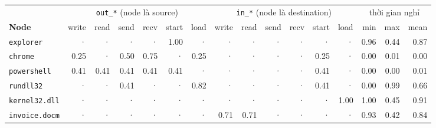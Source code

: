 \begin{table}[H]
\centering
\scriptsize
\setlength{\tabcolsep}{2.6pt}
\begin{tabular}{l *{6}{r} *{6}{r} *{3}{r}}
\toprule
& \multicolumn{6}{c}{\texttt{out\_*} (node là source)} & \multicolumn{6}{c}{\texttt{in\_*} (node là destination)} & \multicolumn{3}{c}{thời gian nghỉ} \\
\cmidrule(lr){2-7}\cmidrule(lr){8-13}\cmidrule(lr){14-16}
\textbf{Node} & write & read & send & recv & start & load & write & read & send & recv & start & load & min & max & mean \\
\midrule
\texttt{explorer} & \textcolor{gray!50}{·} & \textcolor{gray!50}{·} & \textcolor{gray!50}{·} & \textcolor{gray!50}{·} & 1.00 & \textcolor{gray!50}{·} & \textcolor{gray!50}{·} & \textcolor{gray!50}{·} & \textcolor{gray!50}{·} & \textcolor{gray!50}{·} & \textcolor{gray!50}{·} & \textcolor{gray!50}{·} & 0.96 & 0.44 & 0.87 \\
\texttt{chrome} & 0.25 & \textcolor{gray!50}{·} & 0.50 & 0.75 & \textcolor{gray!50}{·} & 0.25 & \textcolor{gray!50}{·} & \textcolor{gray!50}{·} & \textcolor{gray!50}{·} & \textcolor{gray!50}{·} & 0.25 & \textcolor{gray!50}{·} & 0.00 & 0.01 & 0.00 \\
\texttt{powershell} & 0.41 & 0.41 & 0.41 & 0.41 & 0.41 & \textcolor{gray!50}{·} & \textcolor{gray!50}{·} & \textcolor{gray!50}{·} & \textcolor{gray!50}{·} & \textcolor{gray!50}{·} & 0.41 & \textcolor{gray!50}{·} & 0.00 & 0.00 & 0.01 \\
\texttt{rundll32} & \textcolor{gray!50}{·} & \textcolor{gray!50}{·} & 0.41 & \textcolor{gray!50}{·} & \textcolor{gray!50}{·} & 0.82 & \textcolor{gray!50}{·} & \textcolor{gray!50}{·} & \textcolor{gray!50}{·} & \textcolor{gray!50}{·} & 0.41 & \textcolor{gray!50}{·} & 0.00 & 0.99 & 0.66 \\
\texttt{kernel32.dll} & \textcolor{gray!50}{·} & \textcolor{gray!50}{·} & \textcolor{gray!50}{·} & \textcolor{gray!50}{·} & \textcolor{gray!50}{·} & \textcolor{gray!50}{·} & \textcolor{gray!50}{·} & \textcolor{gray!50}{·} & \textcolor{gray!50}{·} & \textcolor{gray!50}{·} & \textcolor{gray!50}{·} & 1.00 & 1.00 & 0.45 & 0.91 \\
\texttt{invoice.docm} & \textcolor{gray!50}{·} & \textcolor{gray!50}{·} & \textcolor{gray!50}{·} & \textcolor{gray!50}{·} & \textcolor{gray!50}{·} & \textcolor{gray!50}{·} & 0.71 & 0.71 & \textcolor{gray!50}{·} & \textcolor{gray!50}{·} & \textcolor{gray!50}{·} & \textcolor{gray!50}{·} & 0.93 & 0.42 & 0.84 \\

\end{tabular}
\end{table}
